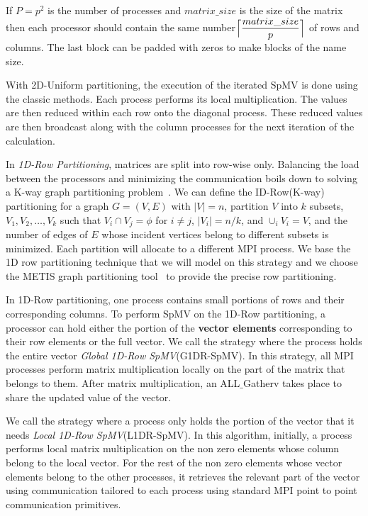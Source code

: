 \documentclass[conference, 10ppt]{IEEEtran}
\begin{document}
If $P=p^2$ is the number of processes
and $matrix\_size$ is the size of the matrix then each processor
should contain the same
number$\Bigl\lceil\dfrac{matrix\_size}{p}\Bigr\rceil$ of rows and
columns. The last block can be padded with zeros to make blocks of the name size.

With 2D-Uniform partitioning, the execution of the iterated SpMV is
done using the classic methods. Each process performs its local
multiplication. The values are then reduced within each row onto the
diagonal process. These reduced values are then broadcast along with the
column processes for the next iteration of the calculation.

In \textit{1D-Row Partitioning}, matrices are split into row-wise
only. Balancing the load between the processors and minimizing the
communication boils down to solving a K-way graph partitioning
problem~\cite{kaya2013analysis}.  We can define the ID-Row(K-way)
partitioning for a graph $G=(V,E)$ with $|V|=n$, partition $V$ into
$k$ subsets, $V_1, V_2, \dots, V_k$ such that $V_i \cap V_j=\phi$ for
$i\neq j$, $|V_i| = n/k$, and $\cup_i V_i = V$, and the number of
edges of $E$ whose incident vertices belong to different subsets is
minimized. Each partition will allocate to a different MPI
process. We base the 1D row partitioning technique that we will model
on this strategy and we choose the METIS graph partitioning
tool~\cite{karypis1995multilevel} to provide the precise row
partitioning.

In 1D-Row partitioning, one process contains small portions of rows
and their corresponding columns. To perform SpMV on the 1D-Row
partitioning, a processor can hold either the portion of the \textbf{vector
  elements} corresponding to their row elements or the full vector.
We call the strategy where the process holds the entire vector \textit{Global
  1D-Row SpMV}(G1DR-SpMV). In this strategy, all MPI processes
perform matrix multiplication locally on the part of the matrix that
belongs to them. After matrix multiplication, an ALL$\_$Gatherv takes
place to share the updated value of the vector.

We call the strategy where a process only holds the portion of the
vector that it needs \textit{Local 1D-Row SpMV}(L1DR-SpMV).  In this
algorithm, initially, a process performs local matrix multiplication
on the non zero elements whose column belong to the local vector.  For
the rest of the non zero elements whose vector elements belong to the
other processes, it retrieves the relevant part of the vector using
communication tailored to each process using standard MPI point to
point communication primitives.
\end{document}
